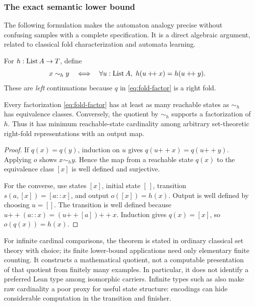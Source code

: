 \subsubsection*{The exact semantic lower bound}

The following formulation makes the automaton analogy precise without confusing samples with a complete specification. It is a direct algebraic argument, related to classical fold characterization and automata learning.\cite{folds,angluin}

\begin{definition}
For $h:\operatorname{List} A\to T$, define
\[
 x\sim_h y\quad\Longleftrightarrow\quad
 \forall u:\operatorname{List} A,\ h(u\mathbin{+\!+}x)=h(u\mathbin{+\!+}y).
\]
These are \emph{left} continuations because $q$ in \cref{eq:fold-factor} is a right fold.
\end{definition}

\begin{theorem}\label{thm:carrier}
Every factorization \cref{eq:fold-factor} has at least as many reachable states as $\sim_h$ has equivalence classes. Conversely, the quotient by $\sim_h$ supports a factorization of $h$. Thus it has minimum reachable-state cardinality among arbitrary set-theoretic right-fold representations with an output map.
\end{theorem}
\begin{proof}
If $q(x)=q(y)$, induction on $u$ gives $q(u\mathbin{+\!+}x)=q(u\mathbin{+\!+}y)$. Applying $o$ shows $x\sim_h y$. Hence the map from a reachable state $q(x)$ to the equivalence class $[x]$ is well defined and surjective.

For the converse, use states $[x]$, initial state $[\,]$, transition $s(a,[x])=[a::x]$, and output $o([x])=h(x)$. Output is well defined by choosing $u=[]$. The transition is well defined because $u\mathbin{+\!+}(a::x)=(u\mathbin{+\!+}[a])\mathbin{+\!+}x$. Induction gives $q(x)=[x]$, so $o(q(x))=h(x)$.
\end{proof}

For infinite cardinal comparisons, the theorem is stated in ordinary classical set theory with choice; its finite lower-bound applications need only elementary finite counting. It constructs a mathematical quotient, not a computable presentation of that quotient from finitely many examples. In particular, it does not identify a preferred Lean type among isomorphic carriers. Infinite types such as  also make raw cardinality a poor proxy for useful state structure: encodings can hide considerable computation in the transition and finisher.

